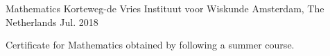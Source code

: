 


\begin{cventries}


\cventry
{Mathematics} %
{Korteweg-de Vries Instituut voor Wiskunde} %
{Amsterdam, The Netherlands} %
{Jul. 2018} %
{ %
\begin{cvitems}
\item {Certificate for Mathematics obtained by following a summer course.}
\end{cvitems}
}


\end{cventries}
